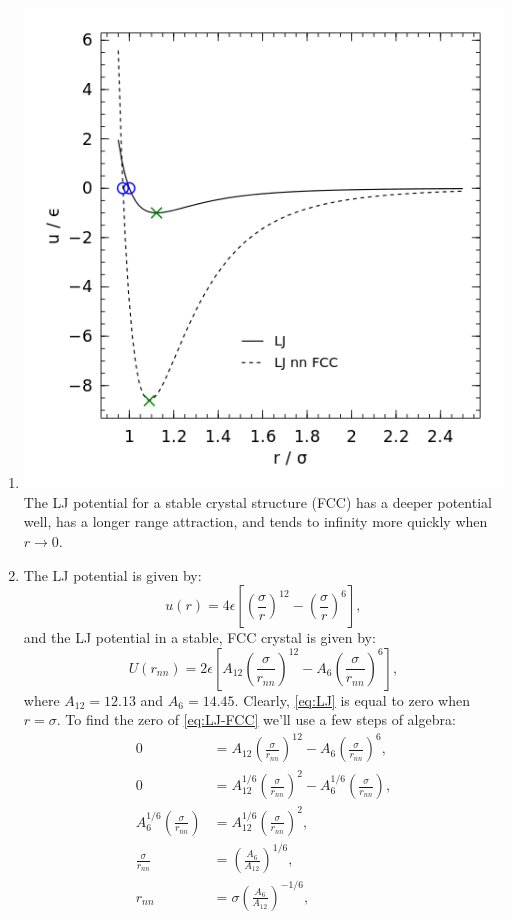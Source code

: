 \documentclass{article}
\begin{document}
\begin{enumerate}[label=\alph*)]
  \item \includegraphics[width=\linewidth]{potentials}
    The LJ potential for a stable crystal structure (FCC) has a deeper potential well, has a longer range attraction, and tends to infinity more quickly when $r \rightarrow 0$.
  \item The LJ potential is given by:
    \begin{equation} \label{eq:LJ}
      u(r) = 4\epsilon\left[\left(\frac{\sigma}{r}\right)^{12} - \left(\frac{\sigma}{r}\right)^{6}\right],
    \end{equation}
    and the LJ potential in a stable, FCC crystal is given by:
    \begin{equation} \label{eq:LJ-FCC}
      U(r_{nn}) = 2\epsilon\left[A_{12}\left(\frac{\sigma}{r_{nn}}\right)^{12} - A_6 \left(\frac{\sigma}{r_{nn}}\right)^{6}\right],
    \end{equation}
    where $A_{12} = 12.13$ and $A_6 = 14.45$.
    Clearly, \eqref{eq:LJ} is equal to zero when $r = \sigma$.
    To find the zero of \eqref{eq:LJ-FCC} we'll use a few steps of algebra:
    \begin{align*}
      0 & = A_{12}\left(\frac{\sigma}{r_{nn}}\right)^{12} - A_6 \left(\frac{\sigma}{r_{nn}}\right)^{6}, \\
      0 & = A_{12}^{1/6}\left(\frac{\sigma}{r_{nn}}\right)^2 - A_6^{1/6} \left(\frac{\sigma}{r_{nn}}\right), \\
      A_6^{1/6} \left(\frac{\sigma}{r_{nn}}\right) & = A_{12}^{1/6}\left(\frac{\sigma}{r_{nn}}\right)^2, \\
      \frac{\sigma}{r_{nn}} & = \left(\frac{A_{6}}{A_{12}}\right)^{1/6}, \\
      r_{nn} & = \sigma \left(\frac{A_{6}}{A_{12}}\right)^{-1/6}, \\
    \end{align*}


\end{enumerate}
\end{document}
